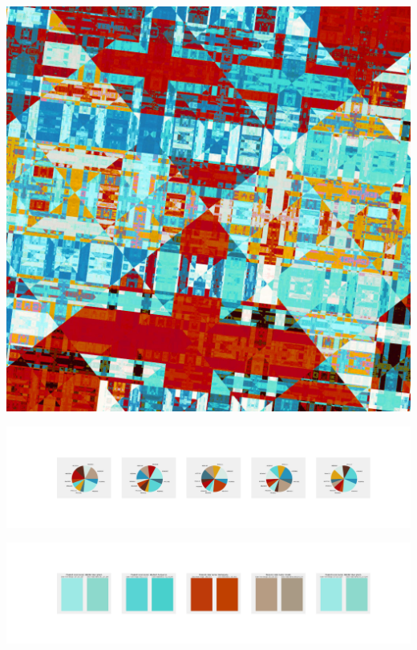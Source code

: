 \documentclass[11pt]{article}
\begin{document}
\begin{landscape}
    \begin{center}
    \includegraphics[width=\textwidth]{./nbimg/file (313).jpg}
    \end{center}

    \begin{center}
    \includegraphics[width=250mm]{./nbimg/pie-238.jpg}
    \end{center}

    \begin{center}
    \includegraphics[width=250mm]{./nbimg/peak-238.jpg}
    \end{center}
    


\end{landscape}
\end{document}
